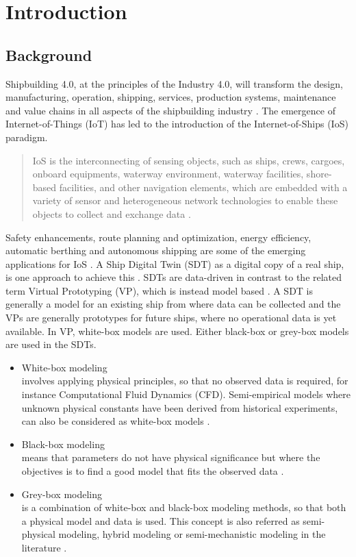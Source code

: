 \chapter{Introduction}
\section{Background}
Shipbuilding 4.0, at the principles of the Industry 4.0, will transform the design, manufacturing, operation, shipping, services, production systems, maintenance and value chains in all aspects of the shipbuilding 
industry \cite{stanic_toward_2018}.
The emergence of Internet-of-Things (IoT) has led to the introduction of the Internet-of-Ships (IoS) paradigm. \begin{quote} IoS is the interconnecting of sensing objects, such as ships, crews, cargoes, onboard equipments, waterway environment, waterway facilities, shore-based facilities, and other navigation elements, which are embedded with a variety of sensor and heterogeneous network technologies to enable these objects to collect and exchange data \cite{liu_internet_2016-1}.\end{quote}
Safety enhancements, route planning and optimization, energy efficiency, automatic berthing and autonomous shipping are some of the emerging applications for IoS \cite{aslam_internet_2020}.
A Ship Digital Twin (SDT) as a digital copy of a real ship, is one approach to achieve this \cite{chen_review_2021}. 
SDTs are data-driven in contrast to the related term Virtual Prototyping (VP), which is instead model based \cite{major_framework_2021}. A SDT is generally a model for an existing ship from where data can be collected and the VPs are generally prototypes for future ships, where no operational data is yet available.
In VP, white-box models are used. Either black-box or grey-box models are used in the SDTs. 

\begin{itemize}
    \item White-box modeling \\
    involves applying physical principles, so that no observed data is required, for instance Computational Fluid Dynamics (CFD). Semi-empirical models where unknown physical constants have been derived from historical experiments, can also be considered as white-box models \cite{leifsson_grey-box_2008}.  

    \item Black-box modeling \\
    means that parameters do not have physical significance but where the objectives is to find a good model that fits the observed data \cite{lindskog_tools_1995}.
    
    \item Grey-box modeling \\
    is a combination of white-box and black-box modeling methods, so that both a physical model and data is used. This concept is also referred as semi-physical modeling, hybrid modeling or semi-mechanistic modeling in the literature \cite{leifsson_grey-box_2008}. 
\end{itemize}

